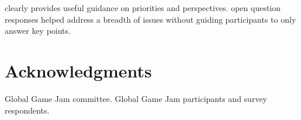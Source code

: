 \documentclass{sig-alternate}
\begin{document}
clearly provides useful guidance on priorities and perspectives. open question responses helped address a breadth of issues without guiding participants to only answer key points.

\section{Acknowledgments}
Global Game Jam committee. Global Game Jam participants and survey respondents.








\end{document}
